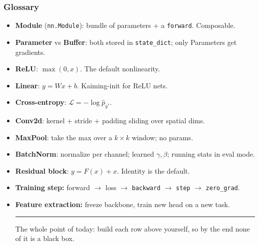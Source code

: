 \begin{frame}
\small{
\frametitle{Glossary}
\begin{itemize}
    \item \textbf{Module} (\texttt{nn.Module}): bundle of parameters + a
    \texttt{forward}. Composable.
    \item \textbf{Parameter} vs \textbf{Buffer}: both stored in
    \texttt{state\_dict}; only Parameters get gradients.
    \item \textbf{ReLU}: $\max(0, x)$. The default nonlinearity.
    \item \textbf{Linear}: $y = Wx + b$. Kaiming-init for ReLU nets.
    \item \textbf{Cross-entropy}: $\mathcal{L} = -\log \hat{p}_{y^*}$.
    \item \textbf{Conv2d}: kernel + stride + padding sliding over spatial dims.
    \item \textbf{MaxPool}: take the max over a $k\times k$ window; no params.
    \item \textbf{BatchNorm}: normalize per channel; learned $\gamma,\beta$;
    running stats in eval mode.
    \item \textbf{Residual block}: $y = F(x) + x$. Identity is the default.
    \item \textbf{Training step:} forward $\to$ loss
    $\to$ \texttt{backward} $\to$ \texttt{step} $\to$ \texttt{zero\_grad}. 
    \item \textbf{Feature extraction:} freeze backbone, train new head on a new
    task.

    \hspace{0pt}
    \rule{0.3\textwidth}{0.5pt}
    \vspace{0.1cm}

    \footnotesize{The whole point of today: build each row above yourself, so
    by the end none of it is a black box.}
\end{itemize}
}
\end{frame}



